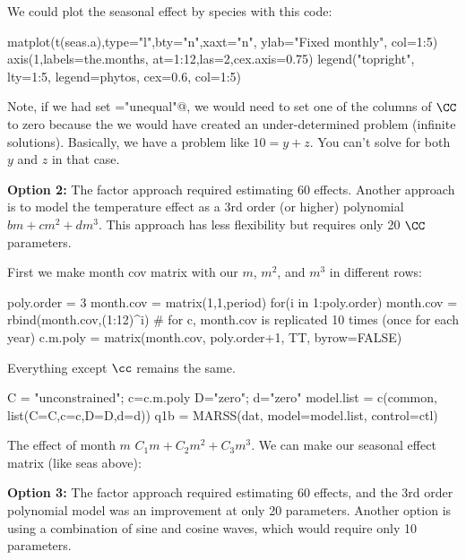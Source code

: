 We could plot the seasonal effect by species with this code:
\begin{Schunk}
\begin{Sinput}
 matplot(t(seas.a),type="l",bty="n",xaxt="n", ylab="Fixed monthly", col=1:5)
 axis(1,labels=the.months, at=1:12,las=2,cex.axis=0.75)
 legend("topright", lty=1:5, legend=phytos, cex=0.6, col=1:5)
\end{Sinput}
\end{Schunk}

Note, if we had set \verb@U="unequal"@, we would need to set one of the columns of $\CC$
to zero because the we would have created an under-determined problem (infinite solutions).  Basically, we have a problem like $10=y+z$.  You can't solve for both $y$ and $z$ in that case.

\bigskip
{\bf Option 2:} The factor approach required estimating 60 effects.  Another approach is to model
the temperature effect as a 3rd order (or higher) polynomial $b m + c m^2 + d m^3$. This approach has less flexibility but requires only 20 $\CC$ parameters.

First we make month cov matrix with our $m$, $m^2$, and $m^3$ in different rows:
\begin{Schunk}
\begin{Sinput}
 poly.order = 3
 month.cov = matrix(1,1,period)
 for(i in 1:poly.order) { month.cov = rbind(month.cov,(1:12)^i)  }
 # for c, month.cov is replicated 10 times (once for each year)
 c.m.poly = matrix(month.cov, poly.order+1, TT, byrow=FALSE)
\end{Sinput}
\end{Schunk}
Everything except $\cc$ remains the same.
\begin{Schunk}
\begin{Sinput}
 C = "unconstrained"; c=c.m.poly
 D="zero"; d="zero"
 model.list = c(common, list(C=C,c=c,D=D,d=d))
 q1b = MARSS(dat, model=model.list, control=ctl)
\end{Sinput}
\end{Schunk}
The effect of month $m$ $C_1  m + C_2  m^2 + C_3  m^3$. We can make our seasonal effect matrix (like seas above):
\begin{Schunk}
\end{Schunk}

\smallskip
{\bf Option 3:}  The factor approach required estimating 60 effects, and the 3rd order polynomial model was an improvement at only 20 parameters. Another option is using a combination of sine and cosine waves, which would require only 10 parameters.


